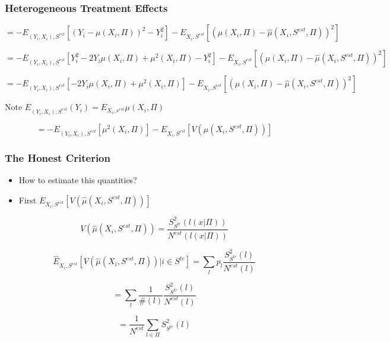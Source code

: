 \documentclass[
  shownotes,
  xcolor={svgnames},
  hyperref={colorlinks,citecolor=DarkBlue,linkcolor=DarkRed,urlcolor=DarkBlue}
  , aspectratio=169]{beamer}
\begin{document}
\begin{frame}[fragile]
\frametitle{Heterogeneous Treatment Effects}




\[
=-E_{(Y_{i},X_{i}),S^{est}}\left[\left(Y_{i}-\mu(X_{i},\Pi)\right)^{2}-Y_{i}^{2}\right]-E_{X_{i},S^{est}}\left[\left(\mu(X_{i},\Pi)-\hat{\mu}(X_{i},S^{est},\Pi)\right)^{2}\right]
\]

\[
=-E_{(Y_{i},X_{i}),S^{est}}\left[Y_{i}^{2}-2Y_{i}\mu(X_{i},\Pi)+\mu^{2}(X_{i},\Pi)-Y_{i}^{2}\right]-E_{X_{i},S^{est}}\left[\left(\mu(X_{i},\Pi)-\hat{\mu}(X_{i},S^{est},\Pi)\right)^{2}\right]
\]

\[
=-E_{(Y_{i},X_{i}),S^{est}}\left[-2Y_{i}\mu(X_{i},\Pi)+\mu^{2}(X_{i},\Pi)\right]-E_{X_{i},S^{est}}\left[\left(\mu(X_{i},\Pi)-\hat{\mu}(X_{i},S^{est},\Pi)\right)^{2}\right]
\]



Note $E_{(Y_{i},X_{i}),S^{est}}(Y_{i})=E_{X_{i},s^{est}}\mu(X_{i},\Pi)$

\[
=-E_{(Y_{i},X_{i}),S^{est}}\left[\mu^{2}(X_{i},\Pi)\right]-E_{X_{i},S^{est}}\left[V(\hat{\mu}(X_{i},S^{est},\Pi))\right]
\]



\end{frame}
\begin{frame}[fragile]
\frametitle{The Honest Criterion}

\begin{itemize}
 \item How to estimate this quantities?
 \item First $E_{X_{i},S^{est}}\left[V(\hat{\mu}(X_{i},S^{est},\Pi))\right]$
\end{itemize}

\[
V(\hat{\mu}(X_{i},S^{est},\Pi))=\frac{S_{S^{tr}}^{2}\left(l\left(x|\Pi\right)\right)}{N^{est}\left(l\left(x|\Pi\right)\right)}
\]

\[
\hat{E}_{X_{i},S^{est}}\left[V(\hat{\mu}(X_{i},S^{est},\Pi))|i\in S^{te}\right]=\sum_{l}p_{l}\frac{S_{S^{tr}}^{2}\left(l\right)}{N^{est}\left(l\right)}
\]

\[
=\sum_{l}\frac{1}{\#(l)}\frac{S_{S^{tr}}^{2}\left(l\right)}{N^{est}\left(l\right)}
\]

\[
=\frac{1}{N^{est}}\sum_{l\in\Pi}S_{S^{tr}}^{2}\left(l\right)
\]

\end{frame}
\end{document}
